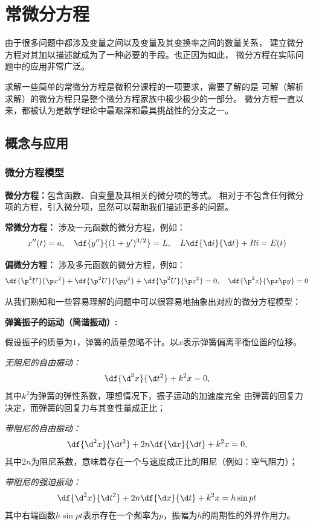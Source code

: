 \setcounter{chapter}{6}

\chapter{常微分方程}

由于很多问题中都涉及变量之间以及变量及其变换率之间的数量关系，
建立微分方程对其加以描述就成为了一种必要的手段。也正因为如此，
微分方程在实际问题中的应用非常广泛。

求解一些简单的常微分方程是微积分课程的一项要求，需要了解的是
可解（解析求解）的微分方程只是整个微分方程家族中极少极少的一部分。
微分方程一直以来，都被认为是数学理论中最艰深和最具挑战性的分支之一。


\section{概念与应用}

\subsection{微分方程模型}

{\bf 微分方程：}包含函数、自变量及其相关的微分项的等式。
相对于不包含任何微分项的方程，引入微分项，显然可以帮助我们描述更多的问题。

{\bf 常微分方程：} 涉及一元函数的微分方程，例如：
  $$x''(t)=a,\quad  \df{y''}{(1+y')^{3/2}}=L,\quad 
  L\df{\d i}{\d t}+Ri=E(t)$$ 
  
{\bf 偏微分方程：} 涉及多元函数的微分方程，例如：
  $$\df{\p^2U}{\p x^2}+\df{\p^2U}{\p y^2}+\df{\p^2U}{\p z^2}=0,\quad 
  \df{\p^2z}{\p x\p y}=0$$

从我们熟知和一些容易理解的问题中可以很容易地抽象出对应的微分方程模型：

{\bf 弹簧振子的运动（简谐振动）:}

假设振子的质量为$1$，弹簧的质量忽略不计。以$x$表示弹簧偏离平衡位置的位移。

{\it 无阻尼的自由振动：}
$$\df{\d^2 x}{\d t^2}+k^2x=0,$$
其中$k^2$为弹簧的{\kaishu 弹性系数}，理想情况下，振子运动的加速度完全
由弹簧的回复力决定，而弹簧的回复力与其变性量成正比；

{\it 带阻尼的自由振动：}
$$\df{\d^2 x}{\d t^2}+2n\df{\d x}{\d t}+k^2x=0,$$
其中$2n$为{\kaishu 阻尼系数}，意味着存在一个与速度成正比的阻尼（例如：空气阻力）；

{\it 带阻尼的强迫振动：}
$$\df{\d^2 x}{\d t^2}+2n\df{\d x}{\d t}+k^2x=h\sin pt$$
其中右端函数$h\sin pt$表示存在一个频率为$p$，振幅为$h$的周期性的外界作用力。

